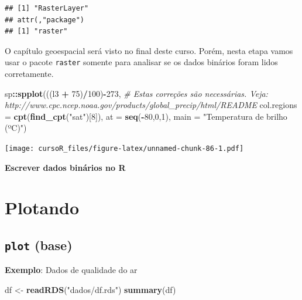 \documentclass[]{book}
\newenvironment{Shaded}{\begin{snugshade}}{\end{snugshade}}
\newcommand{\KeywordTok}[1]{\textcolor[rgb]{0.13,0.29,0.53}{\textbf{#1}}}
\newcommand{\DataTypeTok}[1]{\textcolor[rgb]{0.13,0.29,0.53}{#1}}
\newcommand{\DecValTok}[1]{\textcolor[rgb]{0.00,0.00,0.81}{#1}}
\newcommand{\StringTok}[1]{\textcolor[rgb]{0.31,0.60,0.02}{#1}}
\newcommand{\CommentTok}[1]{\textcolor[rgb]{0.56,0.35,0.01}{\textit{#1}}}
\newcommand{\OperatorTok}[1]{\textcolor[rgb]{0.81,0.36,0.00}{\textbf{#1}}}
\newcommand{\NormalTok}[1]{#1}
\theoremstyle{definition}
\theoremstyle{definition}
\theoremstyle{definition}
\theoremstyle{remark}
\begin{document}
\begin{verbatim}
## [1] "RasterLayer"
## attr(,"package")
## [1] "raster"
\end{verbatim}

O capítulo geoespacial será visto no final deste curso. Porém, nesta
etapa vamos usar o pacote \texttt{raster} somente para analisar se os
dados binários foram lidos corretamente.

\begin{Shaded}
\begin{Highlighting}[]
\NormalTok{sp}\OperatorTok{::}\KeywordTok{spplot}\NormalTok{(((l3 }\OperatorTok{+}\StringTok{ }\DecValTok{75}\NormalTok{)}\OperatorTok{/}\DecValTok{100}\NormalTok{)}\OperatorTok{-}\DecValTok{273}\NormalTok{, }\CommentTok{# Estas correções são necessárias. Veja: http://www.cpc.ncep.noaa.gov/products/global_precip/html/README}
           \DataTypeTok{col.regions =} \KeywordTok{cpt}\NormalTok{(}\KeywordTok{find_cpt}\NormalTok{(}\StringTok{"sat"}\NormalTok{)[}\DecValTok{8}\NormalTok{]),}
           \DataTypeTok{at =} \KeywordTok{seq}\NormalTok{(}\OperatorTok{-}\DecValTok{80}\NormalTok{,}\DecValTok{0}\NormalTok{,}\DecValTok{1}\NormalTok{),}
           \DataTypeTok{main =} \StringTok{"Temperatura de brilho (ºC)"}\NormalTok{) }
\end{Highlighting}
\end{Shaded}

\texttt{[image: cursoR\_files/figure-latex/unnamed-chunk-86-1.pdf]}

\textbf{Escrever dados binários no R}

\chapter{Plotando}\label{plotando}

\section{\texorpdfstring{\texttt{plot}
(base)}{plot (base)}}\label{plot-base}

\textbf{Exemplo}: Dados de qualidade do ar

\begin{Shaded}
\begin{Highlighting}[]
\NormalTok{df <-}\StringTok{ }\KeywordTok{readRDS}\NormalTok{(}\StringTok{"dados/df.rds"}\NormalTok{)}
\KeywordTok{summary}\NormalTok{(df)}
\end{Highlighting}
\end{Shaded}
\end{document}
